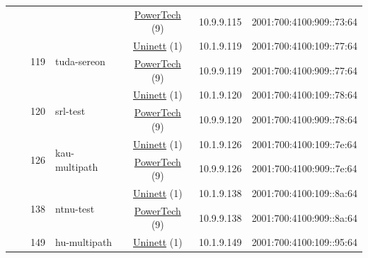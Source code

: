 \begin{small}
\begin{center}
\begin{longtable}{|c|c|c|c|c|c|c|c|}
  &  &  &  & \multicolumn{2}{|c|}{\tiny{\href{http://www.powertech.no}{PowerTech} (9)}} & \tiny{10.9.9.115} & \tiny{2001:700:4100:909::73:64} \\* \cline{3-3}\cline{4-4}\cline{5-5}\cline{6-6}\cline{7-7}\cline{8-8}
  &  & \multirow{2}{*}{\tiny{119}} & \multicolumn{1}{|l|}{\multirow{2}{*}{\tiny{tuda-sereon}}} & \multicolumn{2}{|c|}{\tiny{\href{https://www.uninett.no}{Uninett} (1)}} & \tiny{10.1.9.119} & \tiny{2001:700:4100:109::77:64} \\* \cline{5-5}\cline{6-6}\cline{7-7}\cline{8-8}
  &  &  &  & \multicolumn{2}{|c|}{\tiny{\href{http://www.powertech.no}{PowerTech} (9)}} & \tiny{10.9.9.119} & \tiny{2001:700:4100:909::77:64} \\* \cline{3-3}\cline{4-4}\cline{5-5}\cline{6-6}\cline{7-7}\cline{8-8}
  &  & \multirow{2}{*}{\tiny{120}} & \multicolumn{1}{|l|}{\multirow{2}{*}{\tiny{srl-test}}} & \multicolumn{2}{|c|}{\tiny{\href{https://www.uninett.no}{Uninett} (1)}} & \tiny{10.1.9.120} & \tiny{2001:700:4100:109::78:64} \\* \cline{5-5}\cline{6-6}\cline{7-7}\cline{8-8}
  &  &  &  & \multicolumn{2}{|c|}{\tiny{\href{http://www.powertech.no}{PowerTech} (9)}} & \tiny{10.9.9.120} & \tiny{2001:700:4100:909::78:64} \\* \cline{3-3}\cline{4-4}\cline{5-5}\cline{6-6}\cline{7-7}\cline{8-8}
  &  & \multirow{2}{*}{\tiny{126}} & \multicolumn{1}{|l|}{\multirow{2}{*}{\tiny{kau-multipath}}} & \multicolumn{2}{|c|}{\tiny{\href{https://www.uninett.no}{Uninett} (1)}} & \tiny{10.1.9.126} & \tiny{2001:700:4100:109::7e:64} \\* \cline{5-5}\cline{6-6}\cline{7-7}\cline{8-8}
  &  &  &  & \multicolumn{2}{|c|}{\tiny{\href{http://www.powertech.no}{PowerTech} (9)}} & \tiny{10.9.9.126} & \tiny{2001:700:4100:909::7e:64} \\* \cline{3-3}\cline{4-4}\cline{5-5}\cline{6-6}\cline{7-7}\cline{8-8}
  &  & \multirow{2}{*}{\tiny{138}} & \multicolumn{1}{|l|}{\multirow{2}{*}{\tiny{ntnu-test}}} & \multicolumn{2}{|c|}{\tiny{\href{https://www.uninett.no}{Uninett} (1)}} & \tiny{10.1.9.138} & \tiny{2001:700:4100:109::8a:64} \\* \cline{5-5}\cline{6-6}\cline{7-7}\cline{8-8}
  &  &  &  & \multicolumn{2}{|c|}{\tiny{\href{http://www.powertech.no}{PowerTech} (9)}} & \tiny{10.9.9.138} & \tiny{2001:700:4100:909::8a:64} \\* \cline{3-3}\cline{4-4}\cline{5-5}\cline{6-6}\cline{7-7}\cline{8-8}
  &  & \multirow{2}{*}{\tiny{149}} & \multicolumn{1}{|l|}{\multirow{2}{*}{\tiny{hu-multipath}}} & \multicolumn{2}{|c|}{\tiny{\href{https://www.uninett.no}{Uninett} (1)}} & \tiny{10.1.9.149} & \tiny{2001:700:4100:109::95:64} \\* \cline{5-5}\cline{6-6}\cline{7-7}\cline{8-8}

\end{longtable}
\end{center}
\end{small}
